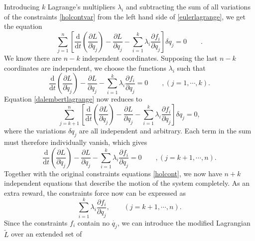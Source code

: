 \documentclass[preprint,11pt]{elsarticle}
\newcommand{\mathd}{\mathrm{d}}
\begin{document}
Introducing $k$ Lagrange's multipliers $\lambda_i$ and subtracting the sum of all variations of the constraints \eqref{holcontvar} from the left hand side of \eqref{eulerlagrange}, we get the equation
\begin{equation}\label{dalembertlagrange}
  \sum_{j=1}^n\left[\frac{\mathd}{\mathd t} \left( \frac{\partial L}{\partial \dot{q}_j} \right)
  - \frac{\partial L}{\partial q_j} - \sum_{i = 1}^k \lambda_i \frac{\partial
  f_i}{\partial q_j}\right]\delta q_j=0 \hspace{2em}  .
\end{equation}
We know there are $n-k$ independent coordinates. Supposing the last $n-k$ coordinates are independent, we choose the functions $\lambda_i$ such that
\begin{equation}\label{eleqn1}
  \frac{\mathd}{\mathd t} \left( \frac{\partial L}{\partial \dot{q}_j} \right)
  - \frac{\partial L}{\partial q_j} - \sum_{i = 1}^k \lambda_i \frac{\partial
  f_i}{\partial q_j}=0 \hspace{2em}, ( j = 1, \cdots, k).
\end{equation}
Equation \eqref{dalembertlagrange} now reduces to
\begin{equation}
  \sum_{j=k+1}^n\left[\frac{\mathd}{\mathd t} \left( \frac{\partial L}{\partial \dot{q}_j} \right)
  - \frac{\partial L}{\partial q_j} - \sum_{i = 1}^k \lambda_i \frac{\partial
  f_i}{\partial q_j}\right]\delta q_j=0,
\end{equation}
where the variations $\delta q_j$ are all independent and arbitrary. Each term in the sum must therefore individually vanish, which gives
\begin{equation}\label{eleqn2}
  \frac{\mathd}{\mathd t} \left( \frac{\partial L}{\partial \dot{q}_j} \right)
  - \frac{\partial L}{\partial q_j} - \sum_{i = 1}^k \lambda_i \frac{\partial
  f_i}{\partial q_j}=0 \hspace{2em}, ( j = k+1, \cdots, n).
\end{equation}
Together with the original constraints equations \eqref{holcont}, we now have $n+k$ independent equations that describe the motion of the system completely.
As an extra reward, the constraints force now can be expressed as
\begin{equation}\label{conforce}
  \sum_{i = 1}^k \lambda_i \frac{\partial f_i}{\partial q_j},\hspace{2em} ( j = k+1, \cdots, n).
\end{equation}
Since the constraints $f_i$ contain no $\dot{q_j}$, we can
introduce the modified Lagrangian $\tilde{L}$ over an extended set of
\end{document}
